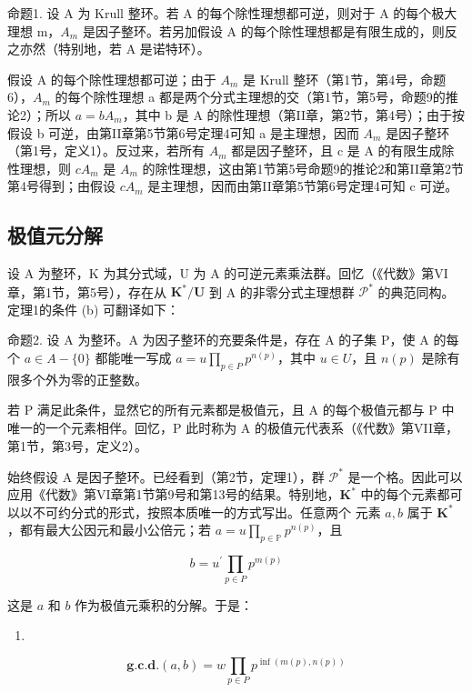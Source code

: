 命题1. 设 A 为 Krull 整环。若 A 的每个除性理想都可逆，则对于 A 的每个极大理想 m，\(A_{m}\) 是因子整环。若另加假设 A 的每个除性理想都是有限生成的，则反之亦然（特别地，若 A 是诺特环）。

假设 A 的每个除性理想都可逆；由于 \(A_{m}\) 是 Krull 整环（第1节，第4号，命题6），\(A_{m}\) 的每个除性理想 a 都是两个分式主理想的交（第1节，第5号，命题9的推论2）；所以 \(a = bA_{m}\)，其中 b 是 A 的除性理想（第II章，第2节，第4号）；由于按假设 b 可逆，由第II章第5节第6号定理4可知 a 是主理想，因而 \(A_{m}\) 是因子整环（第1号，定义1）。反过来，若所有 \(A_{m}\) 都是因子整环，且 c 是 A 的有限生成除性理想，则 \(cA_{m}\) 是 \(A_{m}\) 的除性理想，这由第1节第5号命题9的推论2和第II章第2节第4号得到；由假设 \(cA_{m}\) 是主理想，因而由第II章第5节第6号定理4可知 c 可逆。

\subsection{极值元分解}

设 A 为整环，K 为其分式域，U 为 A 的可逆元素乘法群。回忆（《代数》第VI章，第1节，第5号），存在从 \(\mathbf{K}^* / \mathbf{U}\) 到 A 的非零分式主理想群 \(\mathcal{P}^*\) 的典范同构。定理1的条件 (b) 可翻译如下：

命题2. 设 A 为整环。A 为因子整环的充要条件是，存在 A 的子集 P，使 A 的每个 \(a \in A - \{0\}\) 都能唯一写成 \(a = u \prod_{p \in P} p^{n(p)}\)，其中 \(u \in U\)，且 \(n(p)\) 是除有限多个外为零的正整数。

若 P 满足此条件，显然它的所有元素都是极值元，且 A 的每个极值元都与 P 中唯一的一个元素相伴。回忆，P 此时称为 A 的极值元代表系（《代数》第VII章，第1节，第3号，定义2）。

始终假设 A 是因子整环。已经看到（第2节，定理1），群 \(\mathcal{P}^*\) 是一个格。因此可以应用《代数》第VI章第1节第9号和第13号的结果。特别地，\(\mathbf{K}^*\) 中的每个元素都可以以不可约分式的形式，按照本质唯一的方式写出。任意两个
元素 \(a, b\) 属于 \(\mathbf{K}^*\)，都有最大公因元和最小公倍元；若 \(a = u\prod_{p\in \mathbb{P}}p^{n(p)}\)，且

\[
b = u ^ {\prime} \prod_ {p \in P} p ^ {m (p)}
\]

这是 \(a\) 和 \(b\) 作为极值元乘积的分解。于是：

\begin{enumerate}
\def\labelenumi{(\arabic{enumi})}
\tightlist
\item
\end{enumerate}

\[
\mathbf {g . c . d .} (a, b) = w \prod_ {p \in P} p ^ {\inf (m (p), n (p))}\tag{2}
\]

